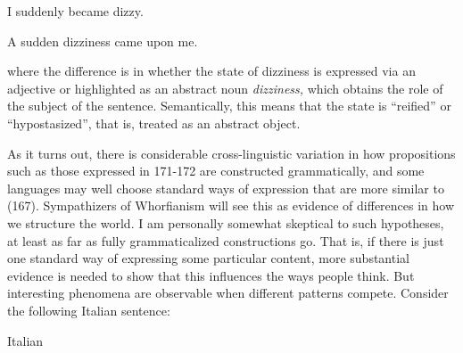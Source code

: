 \begin{listWWNumileveli}
\item {}

\begin{styleExample}
\label{bkm:Ref107116648}I suddenly became dizzy.

\end{styleExample}

\item {}

\begin{styleExample}
\label{bkm:Ref107116651}A sudden dizziness came upon me.

\end{styleExample}

\end{listWWNumileveli}

\begin{styleBodyTextFirst}
where the difference is in whether the state of dizziness is expressed via an adjective or highlighted as an abstract noun \textit{dizziness, }which obtains the role of the subject of the sentence. Semantically, this means that the state is “reified” or “hypostasized”, that is, treated as an abstract object. 

\end{styleBodyTextFirst}

\begin{styleBodytextC}
As it turns out, there is considerable cross-linguistic variation in how propositions such as those expressed in 171{}-172 are constructed grammatically, and some languages may well choose standard ways of expression that are more similar to (167). Sympathizers of Whorfianism will see this as evidence of differences in how we structure the world. I am personally somewhat skeptical to such hypotheses, at least as far as fully grammaticalized constructions go. That is, if there is just one standard way of expressing some particular content, more substantial evidence is needed to show that this influences the ways people think. But interesting phenomena are observable when different patterns compete. Consider the following Italian sentence:

\end{styleBodytextC}

\begin{listWWNumileveli}
\item {}

\begin{styleExample}
Italian

\end{styleExample}

\end{listWWNumileveli}

